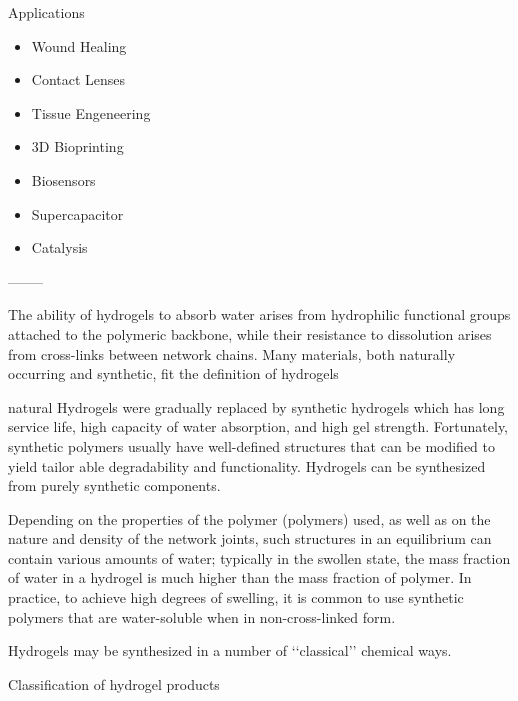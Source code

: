 \documentclass[../../main-notes.tex]{subfiles}
\begin{document}
Applications 

\begin{itemize}
    \item Wound Healing
    \item Contact Lenses
    \item Tissue Engeneering
    \item 3D Bioprinting
    \item Biosensors
    \item Supercapacitor
    \item Catalysis
\end{itemize}

--------


\citep{ahmedHydrogelPreparationCharacterization2015a}

The ability of hydrogels to absorb water arises from hydrophilic functional groups attached to the polymeric backbone, while their resistance to dissolution arises from cross-links between network chains. 
Many materials, both naturally occurring and synthetic, fit the definition of hydrogels

natural Hydrogels were gradually replaced by synthetic hydrogels which has long service life, high capacity of water absorption, and high gel strength. Fortunately, synthetic polymers usually have well-defined structures that can be modified to yield tailor able degradability and functionality. 
Hydrogels can be synthesized from purely synthetic components.

 
Depending on the properties of the polymer (polymers) used, as well as on the nature and density of the network joints, such structures in an equilibrium can contain various amounts of water; 
typically in the swollen state, the mass fraction of water in a hydrogel is much higher than the mass fraction of polymer. 
In practice, to achieve high degrees of swelling, it is common to use synthetic polymers that are water-soluble when in non-cross-linked form.

Hydrogels may be synthesized in a number of ‘‘classical’’ chemical ways. 


Classification of hydrogel products 
\end{document}
